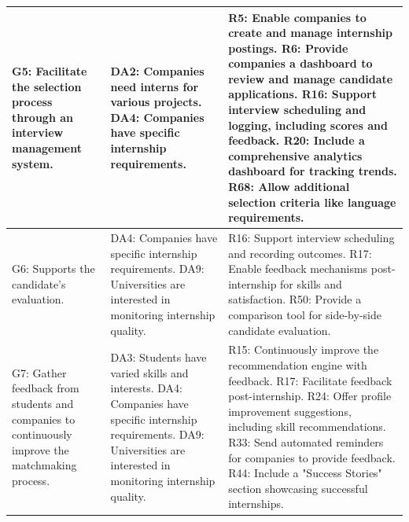\begin{longtable}{| p{} | p{} | p{} |}
G5: Facilitate the selection process through an interview management system. & DA2: Companies need interns for various projects. \newline DA4: Companies have specific internship requirements. & R5: Enable companies to create and manage internship postings. \newline R6: Provide companies a dashboard to review and manage candidate applications. \newline R16: Support interview scheduling and logging, including scores and feedback. \newline R20: Include a comprehensive analytics dashboard for tracking trends. \newline R68: Allow additional selection criteria like language requirements. \\ \hline

G6: Supports the candidate's evaluation. & DA4: Companies have specific internship requirements. \newline DA9: Universities are interested in monitoring internship quality. & R16: Support interview scheduling and recording outcomes. \newline R17: Enable feedback mechanisms post-internship for skills and satisfaction. \newline R50: Provide a comparison tool for side-by-side candidate evaluation. \\ \hline

G7: Gather feedback from students and companies to continuously improve the matchmaking process. & DA3: Students have varied skills and interests. \newline DA4: Companies have specific internship requirements. \newline DA9: Universities are interested in monitoring internship quality. & R15: Continuously improve the recommendation engine with feedback. \newline R17: Facilitate feedback post-internship. \newline R24: Offer profile improvement suggestions, including skill recommendations. \newline R33: Send automated reminders for companies to provide feedback. \newline R44: Include a "Success Stories" section showcasing successful internships. \\ \hline


\end{longtable}
